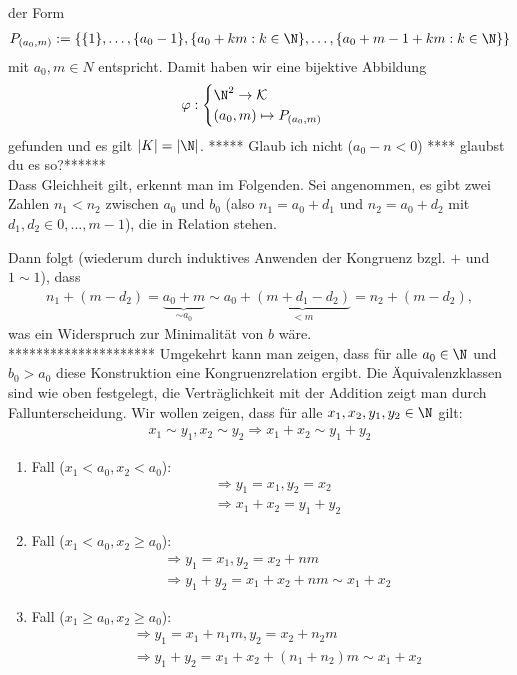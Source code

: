 \begin{solution}
\begin{itemize}
der Form
\begin{align*}
  P_{(a_0,m)} := \{\{1\},\dots,\{a_0 - 1\},\{a_0 + km: k \in \N\},\dots,\{a_0 + m - 1 + km: k \in \N\}\}
\end{align*}
mit $a_0,m \in N$ entspricht. Damit haben wir eine bijektive Abbildung
\begin{align*}
  \varphi: \begin{cases}
    \N^2 \rightarrow \mathcal{K} \\
    (a_0,m) \mapsto P_{(a_0,m)}
  \end{cases}
\end{align*}
gefunden und es gilt $|K| = |\N|$.
***** Glaub ich nicht ($a_0 - n < 0$) **** glaubst du es so?******\\
Dass Gleichheit gilt, erkennt man im Folgenden. Sei angenommen, es gibt zwei Zahlen $n_1 < n_2$ zwischen $a_0$ und $b_0$ (also $n_1 = a_0 + d_1$ und $n_2 = a_0 + d_2$ mit $d_1,d_2 \in {0,...,m-1}$), die in Relation stehen.

Dann folgt (wiederum durch induktives Anwenden der Kongruenz bzgl. $+$ und $1 \sim 1$), dass
\begin{align*}
n_1 + (m-d_2) = \underbrace{a_0 + m}_{\sim a_0} \sim a_0 + \underbrace{(m + d_1 - d_2)}_{<m} = n_2 + (m-d_2),
\end{align*}
was ein Widerspruch zur Minimalität von $b$ wäre.\\
*********************
Umgekehrt kann man zeigen, dass für alle $a_0 \in \N$ und $b_0 > a_0$ diese Konstruktion eine Kongruenzrelation ergibt. Die Äquivalenzklassen sind wie oben festgelegt, die Verträglichkeit mit der Addition zeigt man durch Fallunterscheidung.
Wir wollen zeigen, dass für alle $x_1,x_2,y_1,y_2 \in \N$ gilt:
\begin{align*}
  x_1 \sim y_1,x_2 \sim y_2 \Rightarrow x_1 + x_2 \sim y_1 + y_2
\end{align*}

\begin{enumerate}[label = \textit{\arabic*.}]
\item Fall ($x_1 < a_0, x_2 < a_0$):
\begin{align*}
  &\Rightarrow y_1 = x_1, y_2 = x_2 \\
  &\Rightarrow x_1 + x_2 = y_1 + y_2
\end{align*}
\item Fall ($x_1 < a_0, x_2 \geq a_0$):
\begin{align*}
  &\Rightarrow y_1 = x_1, y_2 = x_2 + nm \\
  &\Rightarrow  y_1 + y_2 = x_1 + x_2 + nm \sim x_1 + x_2
\end{align*}
\item Fall ($x_1 \geq a_0, x_2 \geq a_0$):
\begin{align*}
  &\Rightarrow y_1 = x_1 + n_1 m, y_2 = x_2 + n_2 m \\
  &\Rightarrow  y_1 + y_2 = x_1 + x_2 + (n_1+n_2) m \sim x_1 + x_2
\end{align*}
\end{enumerate}


\end{itemize}
\end{solution}
